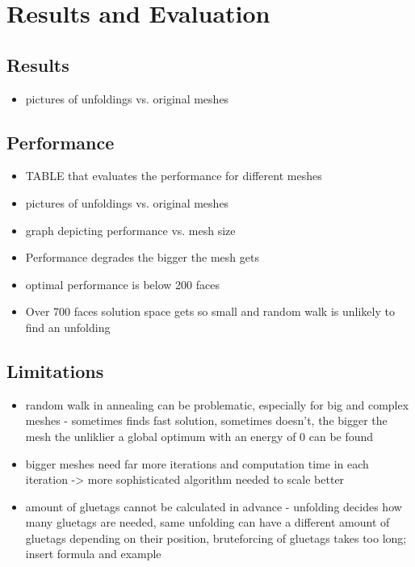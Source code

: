 \documentclass[draft,final]{vutinfth} %
\begin{document}
\chapter{Results and Evaluation}
\label{chap:reseval}

\section{Results}

\begin{itemize}
	\item pictures of unfoldings vs. original meshes
\end{itemize}

\section{Performance}

\begin{itemize}
	\item TABLE that evaluates the performance for different meshes
	\item pictures of unfoldings vs. original meshes
	\item graph depicting performance vs. mesh size
	\item Performance degrades the bigger the mesh gets
	\item optimal performance is below 200 faces
	\item Over 700 faces solution space gets so small and random walk is unlikely to find an unfolding
\end{itemize}

\section{Limitations}

\begin{itemize}
	\item random walk in annealing can be problematic, especially for big and complex meshes - sometimes finds fast solution, sometimes doesn't, the bigger the mesh the unliklier a global optimum with an energy of 0 can be found
	\item bigger meshes need far more iterations and computation time in each iteration -> more sophisticated algorithm needed to scale better
	\item amount of gluetags cannot be calculated in advance - unfolding decides how many gluetags are needed, same unfolding can have a different amount of gluetags depending on their position, bruteforcing of gluetags takes too long; insert formula and example
\end{itemize}
\end{document}
